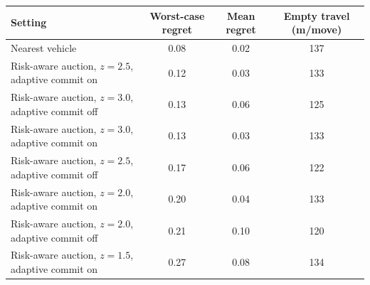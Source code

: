 \begin{tabular}{lccc}
\toprule
Setting & Worst-case regret & Mean regret & Empty travel (m/move) \\
\midrule
Nearest vehicle & 0.08 & 0.02 & 137 \\
Risk-aware auction, $z=2.5$, adaptive commit on & 0.12 & 0.03 & 133 \\
Risk-aware auction, $z=3.0$, adaptive commit off & 0.13 & 0.06 & 125 \\
Risk-aware auction, $z=3.0$, adaptive commit on & 0.13 & 0.03 & 133 \\
Risk-aware auction, $z=2.5$, adaptive commit off & 0.17 & 0.06 & 122 \\
Risk-aware auction, $z=2.0$, adaptive commit on & 0.20 & 0.04 & 133 \\
Risk-aware auction, $z=2.0$, adaptive commit off & 0.21 & 0.10 & 120 \\
Risk-aware auction, $z=1.5$, adaptive commit on & 0.27 & 0.08 & 134 \\
\bottomrule
\end{tabular}
